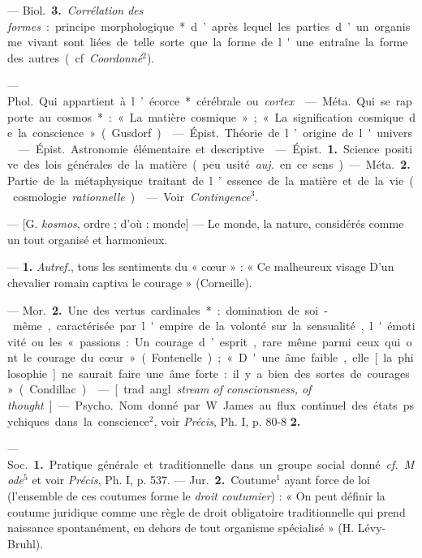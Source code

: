\begin{itemize}[leftmargin=1cm, label=, itemsep=11pt]
— \si{Biol.} {\bf 3.} {\it Corrélation des formes} :
principe morphologique* d’après lequel les parties d’un organisme
vivant sont liées de telle sorte que
la forme de l'une entraîne la forme
des autres (cf. {\it Coordonné}$^2$).

 — \si{Phol.} Qui appartient à
l’écorce* cérébrale ou {\it cortex}.

 — \si{Méta.} Qui se rapporte au
cosmos* : « La matière cosmique » ;
« La signification cosmique de la
conscience » (Gusdorf).

 — \si{Épist.} Théorie de
l’origine de l'univers.

 — \si{Épist.} Astronomie
élémentaire et descriptive.

 — \si{Épist.} {\bf 1.} Science positive des lois générales de la matière
(peu usité {\it auj.} en ce sens). — \si{Méta.}
 {\bf 2.} Partie de la métaphysique traitant de l’essence de la matière et de
la vie (cosmologie {\it rationnelle}).

 — Voir {\it Contingence}$^3$.

 — [G. {\it kosmos}, ordre ; d'où :
monde] — Le monde, la nature,
considérés comme un tout organisé
et harmonieux.

 — {\bf 1.} {\it Autref.}, tous les sentiments du « cœur » : « Ce malheureux
visage D'un chevalier romain captiva
le courage » (Corneille).

— \si{Mor.} {\bf 2.} Une des vertus cardinales* : domination de soi-même,
caractérisée par l'empire de la volonté sur la sensualité, l'émotivité
ou les « passions : Un courage d’esprit, rare même parmi ceux qui ont
le courage du cœur » (Fontenelle);
« D'une âme faible, elle [la philosophie] ne saurait faire une âme
forte : il y a bien des sortes de courages » (Condillac).

 —
[trad. angl. {\it stream of conscionsness,
of thought}] — \si{Psycho.} Nom donné
par W. James au flux continuel des
états psychiques dans la conscience$^2$,
voir  {\it Précis}, Ph. I, p. 80-8 {\bf 2.}

 — \si{Soc.} {\bf 1.} Pratique générale
et traditionnelle dans un groupe
social donné. {\it cf.} {\it Mode}$^5$ et voir
 {\it Précis}, Ph. I, p. 537. — \si{Jur.} {\bf 2.} Coutume$^1$ ayant force de loi (l’ensemble
de ces coutumes forme le {\it droit coutumier}) : « On peut définir la coutume juridique comme une règle de
droit obligatoire traditionnelle qui
prend naissance spontanément, en
dehors de tout organisme spécialisé » (H. Lévy-Bruhl).


\end{itemize}
